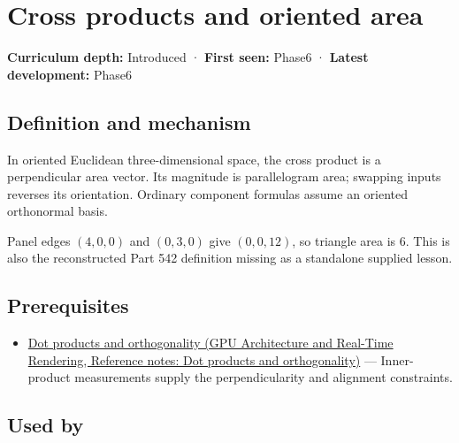 \hypertarget{appendix-2391db8052b1}{}\label{referencestart:appendix-2391db8052b1}
\section{Cross products and oriented area}\label{appendix-2391db8052b1-cross-products-and-oriented-area}

\textbf{Curriculum depth:} Introduced · \textbf{First seen:} Phase6 · \textbf{Latest development:} Phase6

\subsection{Definition and mechanism}\label{appendix-2391db8052b1-definition-and-mechanism}

In oriented Euclidean three-dimensional space, the cross product is a perpendicular area vector. Its magnitude is parallelogram area; swapping inputs reverses its orientation. Ordinary component formulas assume an oriented orthonormal basis.

Panel edges \((4,0,0)\) and \((0,3,0)\) give \((0,0,12)\), so triangle area is \(6\). This is also the reconstructed Part 542 definition missing as a standalone supplied lesson.

\subsection{Prerequisites}\label{appendix-2391db8052b1-prerequisites}

\begin{itemize}
\tightlist
\item
  \href{../06-GPU-Architecture-and-Real-Time-Rendering/main.pdf\#nameddest=appendix-8bc4e8fc547c}{Dot products and orthogonality (GPU Architecture and Real-Time Rendering, Reference notes: Dot products and orthogonality)} --- Inner-product measurements supply the perpendicularity and alignment constraints.
\end{itemize}

\subsection{Used by}\label{appendix-2391db8052b1-used-by}

